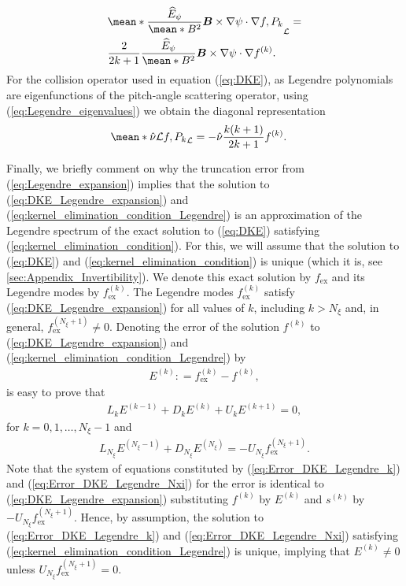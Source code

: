 \documentclass[10pt]{iopart}
\newcommand{\Lorentz}{\mathcal{L}}
\begin{document}
%
\begin{align}
	&
	\mean*{\frac{\widehat{E}_\psi}{\mean*{B^2}}
		\vb*{B}\times \nabla\psi \cdot\nabla f , P_k}_\Lorentz
	=
	\\ 
	&
	\frac{2}{2k+1}
	\frac{\widehat{E}_\psi}{\mean*{B^2}}
	\vb*{B}\times \nabla\psi \cdot\nabla f^{(k)}.
	\nonumber
\end{align}
For the collision operator used in equation (\ref{eq:DKE}), as Legendre polynomials are eigenfunctions of the pitch-angle scattering operator, using (\ref{eq:Legendre_eigenvalues}) we obtain the diagonal representation 
%
\begin{align}
	\mean*{\hat{\nu} \Lorentz f , P_k}_\Lorentz
	&
	=
	-\hat{\nu}
	\frac{k(k+1)}{2k+1}	
	f^{(k)}.
\end{align}

Finally, we briefly comment on why the truncation error from (\ref{eq:Legendre_expansion}) implies that the solution to (\ref{eq:DKE_Legendre_expansion}) and (\ref{eq:kernel_elimination_condition_Legendre}) is an approximation of the Legendre spectrum of the exact solution to (\ref{eq:DKE}) satisfying (\ref{eq:kernel_elimination_condition}). For this, we will assume that the solution to (\ref{eq:DKE}) and (\ref{eq:kernel_elimination_condition}) is unique (which it is, see \ref{sec:Appendix_Invertibility}). We denote this exact solution by $f_{\text{ex}}$ and its Legendre modes by $f^{(k)}_{\text{ex}}$. The Legendre modes $f^{(k)}_{\text{ex}}$ satisfy (\ref{eq:DKE_Legendre_expansion}) for all values of $k$, including $k>N_\xi$ and, in general, $f^{(N_\xi+1)}_{\text{ex}}\ne 0$. Denoting the error of the solution $f^{(k)}$ to (\ref{eq:DKE_Legendre_expansion}) and (\ref{eq:kernel_elimination_condition_Legendre}) by
%
\begin{align}
	E^{(k)} : = f^{(k)}_{\text{ex}} - f^{(k)} ,
\end{align}
is easy to prove that
%
\begin{align}
	L_k E^{(k-1)} + D_k E^{(k)} + U_k E^{(k+1)} = 0, 
	\label{eq:Error_DKE_Legendre_k}
\end{align}
for $k =0,1,\ldots, N_\xi-1$ and 
%
\begin{align}
	L_{N_\xi} E^{(N_\xi-1)} + D_{N_\xi} E^{(N_\xi)} = - U_{N_\xi} f^{(N_\xi+1)}_{\text{ex}}.
	\label{eq:Error_DKE_Legendre_Nxi}
\end{align}
Note that the system of equations constituted by (\ref{eq:Error_DKE_Legendre_k}) and (\ref{eq:Error_DKE_Legendre_Nxi}) for the error is identical to (\ref{eq:DKE_Legendre_expansion}) substituting $f^{(k)}$ by $E^{(k)}$ and $s^{(k)}$ by $- U_{N_\xi} f^{(N_\xi+1)}_{\text{ex}}$. Hence, by assumption, the solution to (\ref{eq:Error_DKE_Legendre_k}) and (\ref{eq:Error_DKE_Legendre_Nxi}) satisfying (\ref{eq:kernel_elimination_condition_Legendre}) is unique, implying that $E^{(k)}\ne 0$ unless $ {U}_{N_\xi} f^{(N_\xi+1)}_{\text{ex}} = 0$.
\end{document}
